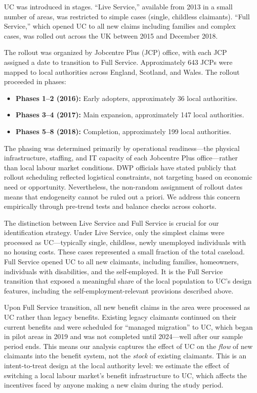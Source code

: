 \documentclass[12pt]{article}
\begin{document}
UC was introduced in stages. ``Live Service,'' available from 2013 in a small number of areas, was restricted to simple cases (single, childless claimants). ``Full Service,'' which opened UC to all new claims including families and complex cases, was rolled out across the UK between 2015 and December 2018.

The rollout was organized by Jobcentre Plus (JCP) office, with each JCP assigned a date to transition to Full Service. Approximately 643 JCPs were mapped to local authorities across England, Scotland, and Wales. The rollout proceeded in phases:

\begin{itemize}
    \item \textbf{Phases 1--2 (2016):} Early adopters, approximately 36 local authorities.
    \item \textbf{Phases 3--4 (2017):} Main expansion, approximately 147 local authorities.
    \item \textbf{Phases 5--8 (2018):} Completion, approximately 199 local authorities.
\end{itemize}

The phasing was determined primarily by operational readiness---the physical infrastructure, staffing, and IT capacity of each Jobcentre Plus office---rather than local labour market conditions. DWP officials have stated publicly that rollout scheduling reflected logistical constraints, not targeting based on economic need or opportunity. Nevertheless, the non-random assignment of rollout dates means that endogeneity cannot be ruled out a priori. We address this concern empirically through pre-trend tests and balance checks across cohorts.

The distinction between Live Service and Full Service is crucial for our identification strategy. Under Live Service, only the simplest claims were processed as UC---typically single, childless, newly unemployed individuals with no housing costs. These cases represented a small fraction of the total caseload. Full Service opened UC to all new claimants, including families, homeowners, individuals with disabilities, and the self-employed. It is the Full Service transition that exposed a meaningful share of the local population to UC's design features, including the self-employment-relevant provisions described above.

Upon Full Service transition, all new benefit claims in the area were processed as UC rather than legacy benefits. Existing legacy claimants continued on their current benefits and were scheduled for ``managed migration'' to UC, which began in pilot areas in 2019 and was not completed until 2024---well after our sample period ends. This means our analysis captures the effect of UC on the \textit{flow} of new claimants into the benefit system, not the \textit{stock} of existing claimants. This is an intent-to-treat design at the local authority level: we estimate the effect of switching a local labour market's benefit infrastructure to UC, which affects the incentives faced by anyone making a new claim during the study period.
\end{document}
